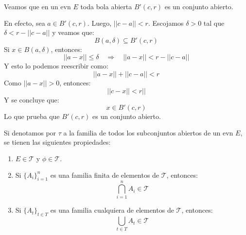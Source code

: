 \begin{ejemplo}
	Veamos que en un evn $E$ toda bola abierta $B'(c, r)$ es un conjunto abierto.   
	
	En efecto, sea $a \in B'(c, r)$.   Luego, $ ||c - a || < r$.   Escojamos $\delta >  0$ tal que $\delta < r - ||c - a||$ y veamos que: 
	$$ B ( a, \delta) \subseteq B'(c, r)$$ 
	Si $x \in B(a, \delta)$, entonces: 
	$$ || a - x || \leq \delta \quad \Rightarrow \quad || a - x || < r - || c - a || $$  
	Y esto lo podemos reescribir como: 
	$$ || a - x || + || c - a || < r $$   
	Como $|| a - x ||> 0$, entonces: 
	$$ || c - x || < r || $$   
	Y se concluye que: 
	$$ x \in B'(c, r) $$   
	Lo que prueba que $B'(c, r)$ es un conjunto abierto.
\end{ejemplo}

\begin{teorema}
	Si denotamos por $\tau$ a la familia de todos los subconjuntos abiertos de un evn $E$, se tienen las siguientes propiedades: 
	\begin{enumerate}
		\item $E \in \mathcal{T}$ y $\phi \in \mathcal{T}$. 
		\item Si $\{A_i\}_{i=1}^n$ es una familia finita de elementos de $\mathcal{T}$, entonces: $$\bigcap_{i=1}^n A_i \in \mathcal{T} $$ 
		\item Si $\{A_t\}_{t\in T}$ es una familia cualquiera de elementos de $\mathcal{T}$, entonces: 
		$$ \bigcup_{t\in T}A_t \in \mathcal{T}$$ 
	\end{enumerate}
\end{teorema}

